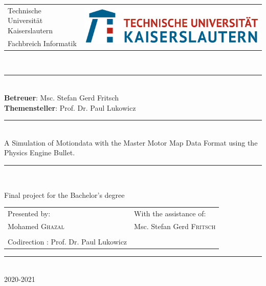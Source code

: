\begin{titlepage}
    \centering
    \begin{tabular}{p{}p{}}
        Technische Universität Kaiserslautern& \multirow{2}{*}{\includegraphics[width=.45\textwidth]{img/TUK.png}}\\
        Fachbreich Informatik&\\
    \end{tabular}\\[\baselineskip]
    \rule{\textwidth}{1pt}\\[.5\baselineskip]
    \textbf{Betreuer}: Msc. Stefan Gerd Fritsch\\
    \textbf{Themensteller}: Prof. Dr. Paul Lukowicz\\[.25\baselineskip]
    \rule{.8\textwidth}{1.6pt}\\[.25\baselineskip]
        A Simulation of Motiondata with the Master Motor Map Data Format using the Physics Engine Bullet.\\[.4\baselineskip]
	\rule{.8\textwidth}{1.6pt}\\[.25\baselineskip]\vfill
	\begin{center}
    	\begin{minipage}{\textwidth}\bfseries
    	    \begin{center}
    	        {\large Final project for the Bachelor's degree}
    	    \end{center}
    	    {\normalfont\bfseries
    	    \begin{tabular}{p{}p{}}
    	        Presented by: & With the assistance of:\\
    	        Mohamed \textsc{Ghazal} & Msc. Stefan Gerd \textsc{Fritsch}\\
    	        \\ Codirection : Prof. Dr. Paul Lukowicz
    	    \end{tabular}}
    	\end{minipage}
	\end{center}
	\rule{\textwidth}{1pt}\\[.5\baselineskip]
	2020-2021
\end{titlepage}
\restoregeometry 
